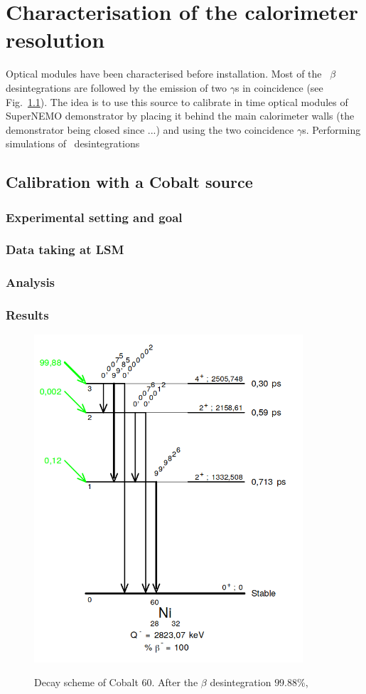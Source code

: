 \chapter{Characterisation of the calorimeter resolution}

Optical modules have been characterised before installation.
Most of the \Co\ $\beta$ desintegrations are followed by the emission of two $\gamma$s in coincidence (see Fig.~\ref{fig:Co_decay_scheme}).
The idea is to use this source to calibrate in time optical modules of SuperNEMO demonstrator by placing it behind the main calorimeter walls (the demonstrator being closed since ...) and using the two coincidence $\gamma$s.
Performing simulations of \Co\ desintegrations



\section{Calibration with a Cobalt source}
\subsection{Experimental setting and goal}
\subsection{Data taking at LSM}
\subsection{Analysis}
\subsection{Results}

\begin{figure}
  \centering
  \includegraphics[width=10cm]{CoSource/fig_CoSource/Co_decay_scheme.png}
  \label{fig:Co_decay_scheme}
  \caption{Decay scheme of Cobalt $60$.
  After the $\beta$ desintegration $99.88$\%, }
\end{figure}
